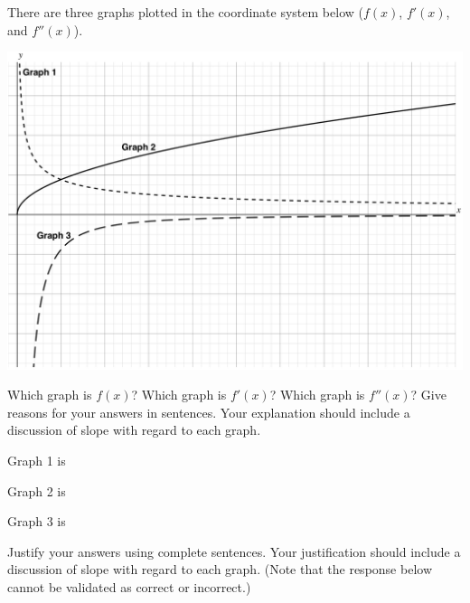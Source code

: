 \documentclass[handout]{ximera}
\begin{document}
\begin{problem}
There are three graphs plotted in the coordinate system below ($f(x)$, $f'(x)$, and $f''(x)$). 


\includegraphics[scale=.12]{SVA-label.png}


Which graph is $f(x)$? Which graph is $f'(x)$? Which graph is $f''(x)$? Give reasons for your answers in sentences. Your explanation should include a discussion of slope with regard to each graph.

\begin{question}
Graph 1 is
\begin{multipleChoice}
\end{multipleChoice}
\end{question}

\begin{question}
Graph 2 is
\begin{multipleChoice}
\end{multipleChoice}
\end{question}

\begin{question}
Graph 3 is
\begin{multipleChoice}
\end{multipleChoice}
\end{question}


Justify your answers using complete sentences. Your justification should include a discussion of slope with regard to each graph. (Note that the response below cannot be validated as correct or incorrect.)
\begin{freeResponse}
\end{freeResponse}
\end{problem}
\end{document}

